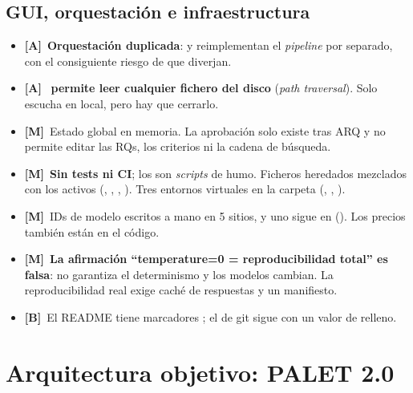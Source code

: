 \documentclass[11pt,a4paper]{article}
\newcommand{\sevA}{\textcolor{alto}{\textbf{[A]}}}
\newcommand{\sevM}{\textcolor{medio}{\textbf{[M]}}}
\newcommand{\sevB}{\textcolor{bajo}{\textbf{[B]}}}
\begin{document}
\subsection{GUI, orquestación e infraestructura}
\begin{itemize}
  \item \sevA~\textbf{Orquestación duplicada}:  y  reimplementan el \emph{pipeline} por separado, con el consiguiente riesgo de que diverjan.
  \item \sevA~\textbf{ permite leer cualquier fichero del disco} (\emph{path traversal}). Solo escucha en local, pero hay que cerrarlo.
  \item \sevM~Estado global en memoria. La aprobación solo existe tras ARQ y no permite editar las RQs, los criterios ni la cadena de búsqueda.
  \item \sevM~\textbf{Sin tests ni CI}; los  son \emph{scripts} de humo. Ficheros heredados mezclados con los activos (, , , ). Tres entornos virtuales en la carpeta (, , ).
  \item \sevM~IDs de modelo escritos a mano en 5 sitios, y uno sigue en  (). Los precios también están en el código.
  \item \sevM~\textbf{La afirmación ``temperature=0 = reproducibilidad total'' es falsa}:  no garantiza el determinismo y los modelos cambian. La reproducibilidad real exige caché de respuestas y un manifiesto.
  \item \sevB~El README tiene marcadores ; el  de git sigue con un valor de relleno.
\end{itemize}

\section{Arquitectura objetivo: PALET 2.0}\label{sec:arquitectura}
\end{document}

